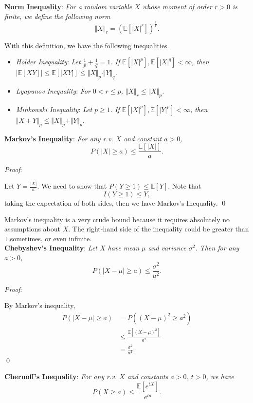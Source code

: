 \documentclass{progartcn}
\begin{document}
		\textbf{Norm Inequality}: \textit{For a random variable $X$ whose moment of order $r>0$ is finite, we define the following norm}
		\[\Vert{X}\Vert_r=(\mathbb{E}[|X|^r])^\frac{1}{r}.\]

		With this definition, we have the following inequalities.
		\begin{itemize}[noitemsep,topsep=0pt]
			\item \textit{Holder Inequality}: \textit{Let $\frac{1}{p}+\frac{1}{q}=1$. If $\mathbb{E}[|X|^p], \mathbb{E}[|X|^q]<\infty$, then $|\mathbb{E}[XY]|\le \mathbb{E}[|XY|]\le \Vert X\Vert_p\cdot \Vert Y\Vert_q$.}
			\item \textit{Lyapunov Inequality}: \textit{For $0<r\le p$, $\Vert X\Vert_r\le\Vert X\Vert_p$.}
			\item \textit{Minkowski Inequality}: \textit{Let $p\ge 1$. If $\mathbb{E}[|X|^p], \mathbb{E}[|Y|^p]<\infty$, then $\Vert X+Y\Vert_p \le \Vert X\Vert_p+\Vert Y\Vert_p$.}\\
		\end{itemize}

		\textbf{Markov's Inequality}: \textit{For any r.v. $X$ and constant $a>0$,}
		\[P(|X|\ge a)\le \frac{\mathbb{E}[|X|]}{a}.\]

		\textit{Proof}:

		Let $Y=\frac{|X|}{a}$. We need to show that $P(Y\ge 1)\le \mathbb{E}[Y]$. Note that 
		\[I(Y\ge 1)\le Y,\]
		taking the expectation of both sides, then we have Markov's Inequality.
		\qed

		Markov's inequality is a very crude bound because it requires absolutely no assumptions about $X$. The right-hand side of the inequality could be greater than $1$ sometimes, or even infinite.\\

		\textbf{Chebyshev's Inequality}: \textit{Let $X$ have mean $\mu$ and variance $\sigma^2$. Then for any $a>0$,}
		\[P(|X-\mu|\ge a)\le \frac{\sigma^2}{a^2}.\]

		\textit{Proof}:

		By Markov's inequality,
		\[\begin{split}
		P(|X-\mu|\ge a)&=P((X-\mu)^2\ge a^2)\\
		&\le \frac{\mathbb{E}[(X-\mu)^2]}{a^2}\\
		&=\frac{\sigma^2}{a^2}.
		\end{split}
		\]
		\qed

		\textbf{Chernoff's Inequality}: \textit{For any r.v. $X$ and constants $a>0$, $t>0$, we have}
		\[P(X\ge a)\le \frac{\mathbb{E}[e^{tX}]}{e^{ta}}.\]
\end{document}
